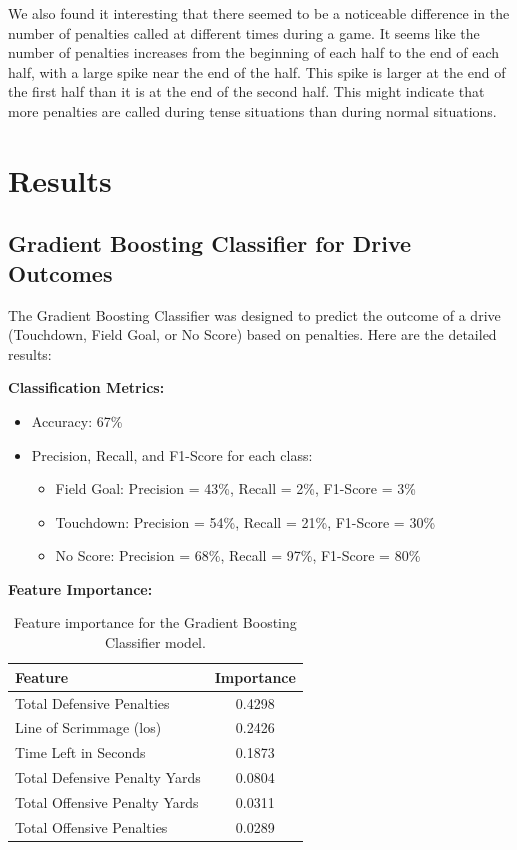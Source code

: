 \documentclass[sigconf, nonacm]{acmart}
\begin{document}
We also found it interesting that there seemed to be a noticeable difference in
the number of penalties called at different times during a game. It seems like
the number of penalties increases from the beginning of each half to the end of
each half, with a large spike near the end of the half. This spike is larger at
the end of the first half than it is at the end of the second half. This might
indicate that more penalties are called during tense situations than during
normal situations.

\section{Results}

\subsection{Gradient Boosting Classifier for Drive Outcomes}

The Gradient Boosting Classifier was designed to predict the outcome of a drive (Touchdown, Field Goal, or No Score) based on penalties. Here are the detailed results:

\textbf{Classification Metrics:}
\begin{itemize}
    \item Accuracy: 67\%
    \item Precision, Recall, and F1-Score for each class:
    \begin{itemize}
        \item Field Goal: Precision = 43\%, Recall = 2\%, F1-Score = 3\%
        \item Touchdown: Precision = 54\%, Recall = 21\%, F1-Score = 30\%
        \item No Score: Precision = 68\%, Recall = 97\%, F1-Score = 80\%
    \end{itemize}
\end{itemize}

\textbf{Feature Importance:}
\begin{table}[h]
\centering
\begin{tabular}{lc}
\hline
\textbf{Feature} & \textbf{Importance} \\
\hline
Total Defensive Penalties & 0.4298 \\
Line of Scrimmage (los) & 0.2426 \\
Time Left in Seconds & 0.1873 \\
Total Defensive Penalty Yards & 0.0804 \\
Total Offensive Penalty Yards & 0.0311 \\
Total Offensive Penalties & 0.0289 \\
\hline
\end{tabular}
\caption{Feature importance for the Gradient Boosting Classifier model.}
\end{table}
\end{document}
